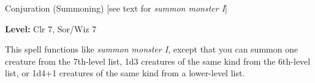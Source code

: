 
Conjuration (Summoning) [see text for \textit{summon monster I}]

\textbf{Level:} Clr 7, Sor/Wiz 7

This spell functions like \textit{summon monster I}, except that you can summon 
one creature from the 7th-level list, 1d3 creatures of the same kind from the 6th-level 
list, or 1d4+1 creatures of the same kind from a lower-level list.

